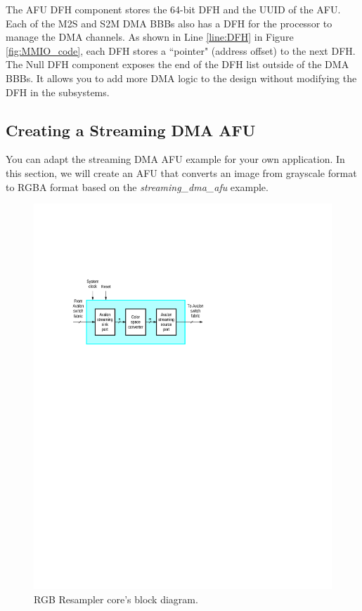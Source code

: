 \documentclass[11pt, twoside, pdftex]{article}
\begin{document}
\noindent
The AFU DFH component stores the 64-bit DFH and the UUID of the AFU.  Each of the M2S and S2M DMA BBBs also has a DFH for the processor to manage the DMA channels. As shown in Line \ref{line:DFH} in Figure \ref{fig:MMIO_code}, each DFH stores a ``pointer" (address offset) to the next DFH. The Null DFH component exposes the end of the DFH list outside of the DMA BBBs. It allows you to add more DMA logic to the design without modifying the DFH in the subsystems.

\subsection{Creating a Streaming DMA AFU}
You can adapt the streaming DMA AFU example for your own application. In this section, we will create an AFU that converts an image from grayscale format to RGBA format based on the {\it streaming\_dma\_afu} example. \\

\begin{figure}[h]
    \centering
    \includegraphics{figures/rgb_resampler.pdf}
    \caption{RGB Resampler core's block diagram.}
    \label{fig:resampler}
\end{figure}
\end{document}
